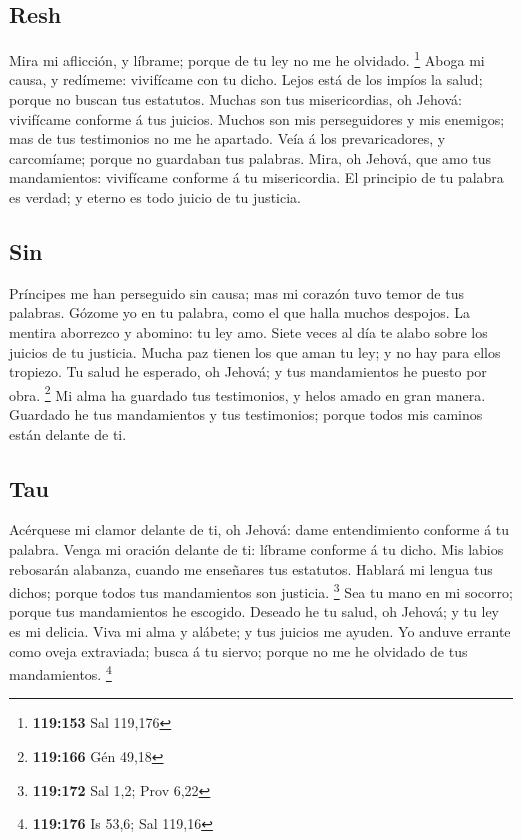 \hypertarget{resh}{%
\subsection{Resh}\label{resh}}

 Mira mi aflicción, y líbrame; porque de tu ley no me he
olvidado. \footnote{\textbf{119:153} Sal 119,176}  Aboga
mi causa, y redímeme: vivifícame con tu dicho.  Lejos está
de los impíos la salud; porque no buscan tus estatutos. 
Muchas son tus misericordias, oh Jehová: vivifícame conforme á tus
juicios.  Muchos son mis perseguidores y mis enemigos; mas
de tus testimonios no me he apartado.  Veía á los
prevaricadores, y carcomíame; porque no guardaban tus palabras.
 Mira, oh Jehová, que amo tus mandamientos: vivifícame
conforme á tu misericordia.  El principio de tu palabra es
verdad; y eterno es todo juicio de tu justicia.

\hypertarget{sin}{%
\subsection{Sin}\label{sin}}

 Príncipes me han perseguido sin causa; mas mi corazón
tuvo temor de tus palabras.  Gózome yo en tu palabra, como
el que halla muchos despojos.  La mentira aborrezco y
abomino: tu ley amo.  Siete veces al día te alabo sobre
los juicios de tu justicia.  Mucha paz tienen los que aman
tu ley; y no hay para ellos tropiezo.  Tu salud he
esperado, oh Jehová; y tus mandamientos he puesto por obra. \footnote{\textbf{119:166}
  Gén 49,18}  Mi alma ha guardado tus testimonios, y helos
amado en gran manera.  Guardado he tus mandamientos y tus
testimonios; porque todos mis caminos están delante de ti.

\hypertarget{tau}{%
\subsection{Tau}\label{tau}}

 Acérquese mi clamor delante de ti, oh Jehová: dame
entendimiento conforme á tu palabra.  Venga mi oración
delante de ti: líbrame conforme á tu dicho.  Mis labios
rebosarán alabanza, cuando me enseñares tus estatutos. 
Hablará mi lengua tus dichos; porque todos tus mandamientos son
justicia. \footnote{\textbf{119:172} Sal 1,2; Prov 6,22} 
Sea tu mano en mi socorro; porque tus mandamientos he escogido.
 Deseado he tu salud, oh Jehová; y tu ley es mi delicia.
 Viva mi alma y alábete; y tus juicios me ayuden.
 Yo anduve errante como oveja extraviada; busca á tu
siervo; porque no me he olvidado de tus mandamientos. \footnote{\textbf{119:176}
  Is 53,6; Sal 119,16}

